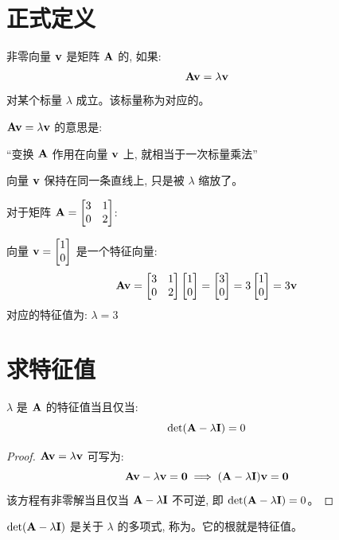 \section{正式定义}

\begin{definition}[特征向量与特征值]
非零向量 $\mathbf{v}$ 是矩阵 $\mathbf{A}$ 的, 如果:
\[
\mathbf{A}\mathbf{v} = \lambda\mathbf{v}
\]
对某个标量 $\lambda$ 成立。该标量称为对应的。
\end{definition}

\begin{intuition}
$\mathbf{A}\mathbf{v} = \lambda\mathbf{v}$ 的意思是:
\begin{center}
``变换 $\mathbf{A}$ 作用在向量 $\mathbf{v}$ 上, 就相当于一次标量乘法''
\end{center}
向量 $\mathbf{v}$ 保持在同一条直线上, 只是被 $\lambda$ 缩放了。
\end{intuition}

\begin{example}
对于矩阵 $\mathbf{A} = \begin{bmatrix} 3 & 1 \\ 0 & 2 \end{bmatrix}$:

向量 $\mathbf{v} = \begin{bmatrix} 1 \\ 0 \end{bmatrix}$ 是一个特征向量:
\[
\mathbf{A}\mathbf{v} = \begin{bmatrix} 3 & 1 \\ 0 & 2 \end{bmatrix}\begin{bmatrix} 1 \\ 0 \end{bmatrix} = \begin{bmatrix} 3 \\ 0 \end{bmatrix} = 3\begin{bmatrix} 1 \\ 0 \end{bmatrix} = 3\mathbf{v}
\]
对应的特征值为: $\lambda = 3$
\end{example}

\section{求特征值}

\begin{theorem}[特征方程]
$\lambda$ 是 $\mathbf{A}$ 的特征值当且仅当:
\[
\det(\mathbf{A} - \lambda\mathbf{I}) = 0
\]
\end{theorem}

\begin{proof}
$\mathbf{A}\mathbf{v} = \lambda\mathbf{v}$ 可写为:
\[
\mathbf{A}\mathbf{v} - \lambda\mathbf{v} = \mathbf{0} \implies (\mathbf{A} - \lambda\mathbf{I})\mathbf{v} = \mathbf{0}
\]
该方程有非零解当且仅当 $\mathbf{A} - \lambda\mathbf{I}$ 不可逆, 即 $\det(\mathbf{A} - \lambda\mathbf{I}) = 0$。
\end{proof}

\begin{definition}[特征多项式]
$\det(\mathbf{A} - \lambda\mathbf{I})$ 是关于 $\lambda$ 的多项式, 称为。它的根就是特征值。
\end{definition}

